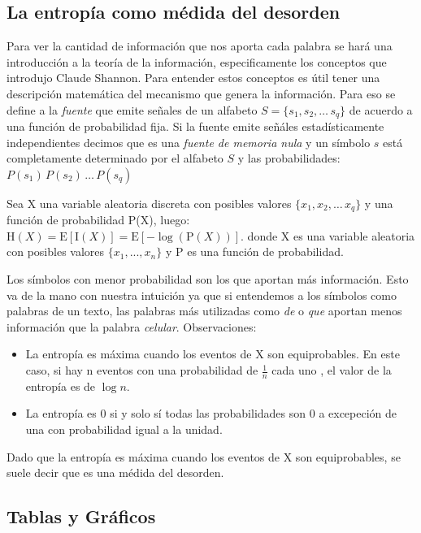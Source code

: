 \subsection{La entropía como médida del desorden}
\label{sub:entropiaShannon}

Para ver la cantidad de información que nos aporta cada palabra se hará una introducción a la teoría de la información, especificamente
los conceptos que introdujo Claude Shannon\cite{shannon2001mathematical}.
Para entender estos conceptos es útil tener una descripción matemática del mecanismo que genera la información. Para eso se define a 
la \textit{fuente} que emite señales de un alfabeto $ S = \{s_1, s_2, \dots\, s_q\}$ de acuerdo a una función de probabilidad fija.
Si la fuente emite señáles estadísticamente independientes decimos que es una \textit{fuente de memoria nula} y un símbolo $s$ está completamente determinado por el alfabeto $S$ y las probabilidades:
$P(s_1)\,P(s_2)\, \dots\, P(s_q)$

Sea X una variable aleatoria discreta con posibles valores $\{x_1, x_2, \dots\, x_q\}$ y una función de probabilidad P(X), luego:
${\displaystyle \mathrm {H} (X)=\mathrm {E} [\mathrm {I} (X)]=\mathrm {E} [-\log(\mathrm {P} (X))].}$
donde X es una variable aleatoria con posibles valores $\{x_1, ... , x_n\}$ y P es una función de probabilidad.

Los símbolos con menor probabilidad son los que aportan más información. Esto va de la mano con nuestra intuición ya que si entendemos a los símbolos como palabras de un texto, las palabras más utilizadas como \textit{de} o \textit{que} aportan menos información que la palabra \textit{celular}. 
Observaciones:
\begin{itemize}
    \item La entropía es máxima cuando los eventos de X son equiprobables. En este caso, si hay n eventos con una probabilidad de $\frac{1}{n}$ cada uno , el valor de la entropía es de $\log n$.
    \item La entropía es 0 si y solo sí todas las probabilidades son 0 a excepeción de una con probabilidad igual a la unidad. 
\end{itemize}

Dado que la entropía es máxima cuando los eventos de X son equiprobables, se suele decir que es una médida del desorden.


\subsection{Tablas y Gráficos}
\label{sub:tablas}

